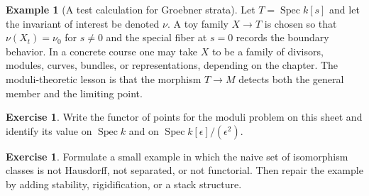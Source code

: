 \documentclass[11pt]{amsart}
\theoremstyle{definition}
\newtheorem{example}[theorem]{Example}
\newtheorem{exercise}[theorem]{Exercise}
\newcommand{\Spec}{\operatorname{Spec}}
\begin{document}
\begin{example}[A test calculation for Groebner strata]
Let $T=\Spec k[s]$ and let the invariant of interest be denoted $\nu$.  A toy family $X\to T$ is chosen so that $\nu(X_t)=\nu_0$ for $s\ne0$ and the special fiber at $s=0$ records the boundary behavior.  In a concrete course one may take $X$ to be a family of divisors, modules, curves, bundles, or representations, depending on the chapter.  The moduli-theoretic lesson is that the morphism $T\to M$ detects both the general member and the limiting point.
\end{example}
\begin{exercise}
Write the functor of points for the moduli problem on this sheet and identify its value on $\Spec k$ and on $\Spec k[\epsilon]/(\epsilon^2)$.
\end{exercise}
\begin{exercise}
Formulate a small example in which the naive set of isomorphism classes is not Hausdorff, not separated, or not functorial.  Then repair the example by adding stability, rigidification, or a stack structure.
\end{exercise}
\clearpage
\end{document}
